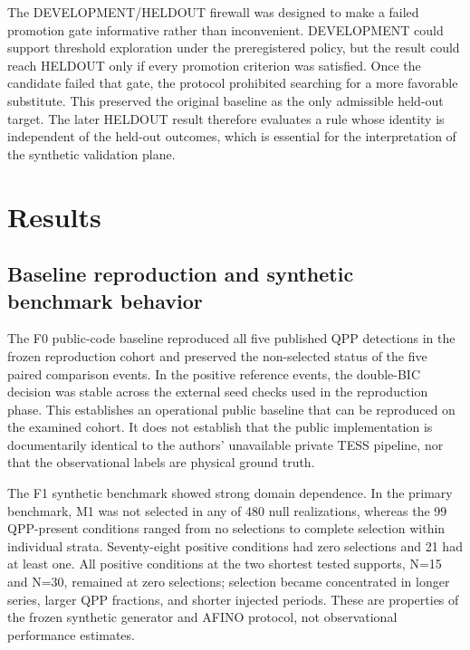 \documentclass[11pt,a4paper]{article}
\begin{document}
The DEVELOPMENT/HELDOUT firewall was designed to make a failed promotion gate informative rather than inconvenient. DEVELOPMENT could support threshold exploration under the preregistered policy, but the result could reach HELDOUT only if every promotion criterion was satisfied. Once the candidate failed that gate, the protocol prohibited searching for a more favorable substitute. This preserved the original baseline as the only admissible held-out target. The later HELDOUT result therefore evaluates a rule whose identity is independent of the held-out outcomes, which is essential for the interpretation of the synthetic validation plane.

\section{Results}
\subsection{Baseline reproduction and synthetic benchmark behavior}
The F0 public-code baseline reproduced all five published QPP detections in the frozen reproduction cohort and preserved the non-selected status of the five paired comparison events. In the positive reference events, the double-BIC decision was stable across the external seed checks used in the reproduction phase. This establishes an operational public baseline that can be reproduced on the examined cohort. It does not establish that the public implementation is documentarily identical to the authors' unavailable private TESS pipeline, nor that the observational labels are physical ground truth.

The F1 synthetic benchmark showed strong domain dependence. In the primary benchmark, M1 was not selected in any of 480 null realizations, whereas the 99 QPP-present conditions ranged from no selections to complete selection within individual strata. Seventy-eight positive conditions had zero selections and 21 had at least one. All positive conditions at the two shortest tested supports, N=15 and N=30, remained at zero selections; selection became concentrated in longer series, larger QPP fractions, and shorter injected periods. These are properties of the frozen synthetic generator and AFINO protocol, not observational performance estimates.
\end{document}
